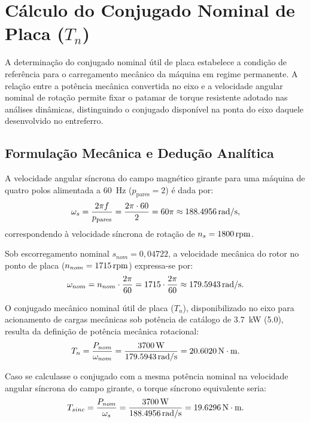 \section{Cálculo do Conjugado Nominal de Placa ($T_n$)}\label{sec:calculo_tn}

A determinação do conjugado nominal útil de placa estabelece a condição de referência para o carregamento mecânico da máquina em regime permanente. A relação entre a potência mecânica convertida no eixo e a velocidade angular nominal de rotação permite fixar o patamar de torque resistente adotado nas análises dinâmicas, distinguindo o conjugado disponível na ponta do eixo daquele desenvolvido no entreferro.

\subsection{Formulação Mecânica e Dedução Analítica}\label{subsec:deducao_tn}

A velocidade angular síncrona do campo magnético girante para uma máquina de quatro polos alimentada a \SI{60}{\hertz} ($p_{\text{pares}} = 2$) é dada por:
\begin{equation}
\omega_s = \frac{2\pi f}{p_{\text{pares}}} = \frac{2\pi \cdot 60}{2} = 60\pi \approx \SI{188,4956}{\mathrm{rad/s}},
\label{eq:omega_sincrona_rad}
\end{equation}
correspondendo à velocidade síncrona de rotação de $n_s = \SI{1800}{\mathrm{rpm}}$.

Sob escorregamento nominal $s_{nom} = 0{,}04722$, a velocidade mecânica do rotor no ponto de placa ($n_{nom} = \SI{1715}{\mathrm{rpm}}$) expressa-se por:
\begin{equation}
\omega_{nom} = n_{nom} \cdot \frac{2\pi}{60} = 1715 \cdot \frac{2\pi}{60} \approx \SI{179,5943}{\mathrm{rad/s}}.
\label{eq:omega_nominal_rad}
\end{equation}

O conjugado mecânico nominal útil de placa ($T_n$), disponibilizado no eixo para acionamento de cargas mecânicas sob potência de catálogo de \SI{3,7}{\kilo\watt} (\SI{5,0}{\cv}), resulta da definição de potência mecânica rotacional:
\begin{equation}
T_n = \frac{P_{nom}}{\omega_{nom}} = \frac{\SI{3700}{\watt}}{\SI{179,5943}{\mathrm{rad/s}}} = \SI{20,6020}{\mathrm{N\cdot m}}.
\label{eq:torque_nominal_placa}
\end{equation}

Caso se calculasse o conjugado com a mesma potência nominal na velocidade angular síncrona do campo girante, o torque síncrono equivalente seria:
\begin{equation}
T_{sinc} = \frac{P_{nom}}{\omega_s} = \frac{\SI{3700}{\watt}}{\SI{188,4956}{\mathrm{rad/s}}} = \SI{19,6296}{\mathrm{N\cdot m}}.
\label{eq:torque_sincrono}
\end{equation}

